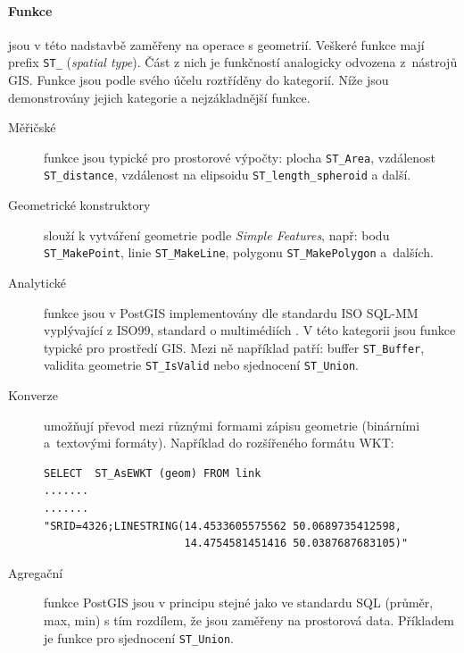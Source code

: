 \documentclass[a4paper,12pt,oneside]{report}
\begin{document}
\paragraph*{Funkce} jsou v této nadstavbě zaměřeny na operace s
geometrií. Veškeré funkce mají prefix \texttt{ST\_} (\textit{spatial
  type}). Část z nich je funkčností analogicky odvozena z~nástrojů
GIS. Funkce jsou podle svého účelu roztříděny do kategorií. Níže jsou
demonstrovány jejich kategorie a nejzákladnější funkce.
\begin{description}
\item[Měřičské] funkce jsou typické pro prostorové výpočty: plocha
  \texttt{ST\_Area}, vzdálenost \texttt{ST\_distance}, vzdálenost na
  elipsoidu \texttt{ST\_length\_spheroid} a další.

\item[Geometrické konstruktory] slouží k vytváření geometrie podle
  \textit{Simple Features}, např: bodu \texttt{ST\_MakePoint},
  linie \texttt{ST\_MakeLine}, polygonu \texttt{ST\_MakePolygon} a~dalších.

\item[Analytické] funkce jsou v PostGIS implementovány dle standardu
  ISO SQL-MM vyplý\-vající z ISO99, standard o multimédiích 
  \cite{sqlmm}. V této kategorii jsou funkce typické pro prostředí
  GIS. Mezi ně například patří: buffer \texttt{ST\_Buffer}, validita
  geometrie \texttt{ST\_IsValid} nebo sjednocení \texttt{ST\_Union}.

\item[Konverze] umožňují převod mezi různými formami zápisu geometrie (binárními a~textovými
  formáty). Například do rozšířeného formátu \acs{WKT}:

\begin{verbatim}
SELECT  ST_AsEWKT (geom) FROM link
.......
.......
"SRID=4326;LINESTRING(14.4533605575562 50.0689735412598,
                      14.4754581451416 50.0387687683105)"
\end{verbatim}

\item[Agregační] funkce PostGIS jsou v principu stejné jako ve
  standardu SQL (průměr, max, min) s tím rozdílem, že jsou zaměřeny na
  prostorová data. Příkladem je funkce pro sjednocení
  \texttt{ST\_Union}.
\end{description}
\end{document}
